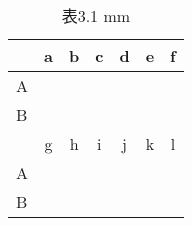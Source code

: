 \begin{table}[htbp]
  \centering
  \caption{表3.1 mm}
  \begin{tabular}{p{4.0em}cccccc}
    \toprule
    \multicolumn{1}{c}{} & \multicolumn{1}{p{4.0em}}{a}  & \multicolumn{1}{p{4.0em}}{b} & \multicolumn{1}{p{4.0em}}{c} & \multicolumn{1}{p{4.0em}}{d} & \multicolumn{1}{p{4.0em}}{e} & \multicolumn{1}{p{4.0em}}{f} \\
    \midrule
    A                    &                               &                              &                              &                              &                              &                              \\
    B                    &                               &                              &                              &                              &                              &                              \\
    \midrule
    \midrule
    \multicolumn{1}{c}{} & \multicolumn{1}{p{4.0em}}{g } & \multicolumn{1}{p{4.0em}}{h} & \multicolumn{1}{p{4.0em}}{i} & \multicolumn{1}{p{4.0em}}{j} & \multicolumn{1}{p{4.0em}}{k} & \multicolumn{1}{p{4.0em}}{l} \\
    \midrule
    A                    &                               &                              &                              &                              &                              &                              \\
    B                    &                               &                              &                              &                              &                              &                              \\
    \bottomrule
  \end{tabular}%
  \label{tab:tbl-1-1}%
\end{table}%

